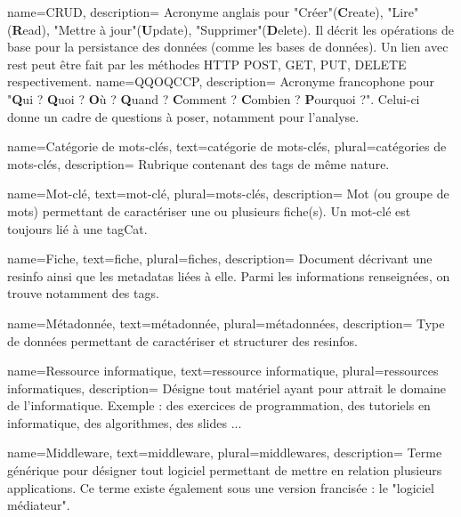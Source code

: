 {
    name={CRUD},
    description={
        Acronyme anglais pour "Créer"(\textbf{C}reate), "Lire" (\textbf{R}ead), "Mettre à jour"(\textbf{U}pdate), "Supprimer"(\textbf{D}elete). Il décrit les opérations de base pour la persistance des données (comme les bases de données). Un lien avec \Gls{rest} peut être fait par les méthodes HTTP POST, GET, PUT, DELETE respectivement.
    }
}
{
    name={QQOQCCP},
    description={
        Acronyme francophone pour "\textbf{Q}ui ? \textbf{Q}uoi ? \textbf{O}ù ? \textbf{Q}uand ? \textbf{C}omment ? \textbf{C}ombien ? \textbf{P}ourquoi ?". Celui-ci donne un cadre de questions à poser, notamment pour l'analyse.
    }
}

{
    name={Catégorie de mots-clés},
    text={catégorie de mots-clés},
    plural={catégories de mots-clés},
    description={
        Rubrique contenant des \glspl{tag} de même nature. 
    }
}

{
    name={Mot-clé},
    text={mot-clé},
    plural={mots-clés},
    description={
        Mot (ou groupe de mots) permettant de caractériser une ou plusieurs \gls{fiche}(s).
        Un mot-clé est toujours lié à une \gls{tagCat}.
    }
}

{
    name={Fiche},
    text={fiche},
    plural={fiches},
    description={
        Document décrivant une \gls{resinfo} ainsi que les \glspl{metadata} liées à elle. Parmi les informations renseignées, on trouve notamment des \glspl{tag}.
    }
}

{
    name={Métadonnée},
    text={métadonnée},
    plural={métadonnées},
    description={
        Type de données permettant de caractériser et structurer des \glspl{resinfo}.
    }
}

{
    name={Ressource informatique},
    text={ressource informatique},
    plural={ressources informatiques},
    description={
        Désigne tout matériel ayant pour attrait le domaine de l'informatique. Exemple : des exercices de programmation, des tutoriels en informatique, des algorithmes, des slides ...
    }
}

{
    name={Middleware},
    text={middleware},
    plural={middlewares},
    description={
        Terme générique pour désigner tout logiciel permettant de mettre en relation plusieurs applications.
        Ce terme existe également sous une version francisée : le "logiciel médiateur".
    }
}

